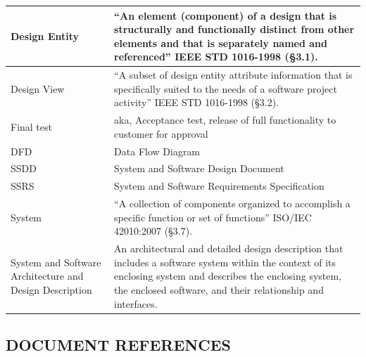 \documentclass[twoside,letterpaper]{article}
\begin{document}
{\begin{flushleft}
\begin{supertabular}{|m{1.3587599in}|m{5.00806in}|}
 Design Entity &
{{\textquotedblleft}}{An
element (component) of a design that is structurally and functionally
distinct from other elements and that is separately named and
referenced{\textquotedblright} IEEE STD 1016-1998 (\S3.1).}
\\\hline

 Design View &
{{\textquotedblleft}}{A
subset of design entity attribute information that is specifically
suited to the needs of a software project activity{\textquotedblright}
IEEE STD 1016-1998 (\S3.2).}\\\hline

 Final test &
 aka, Acceptance test, release of
full functionality to customer for approval\\\hline

 DFD &
 Data Flow Diagram\\\hline

 SSDD &
 System and Software Design Document\\\hline

 SSRS &
 System and Software Requirements Specification\\\hline

 System & {{\textquotedblleft}}{A
collection of components organized to accomplish a specific function or
set of functions{\textquotedblright} ISO/IEC 42010:2007
(\S3.7).}\\\hline

 System and Software Architecture and Design Description &
 An architectural and detailed design description that includes a software system within the context of its enclosing system and describes the enclosing system, the
enclosed software, and their relationship and interfaces.\\\hline

\end{supertabular}
\end{flushleft}

\bigskip

\subsection[DOCUMENT REFERENCES]
{\bfseries DOCUMENT REFERENCES}

}
\end{document}
